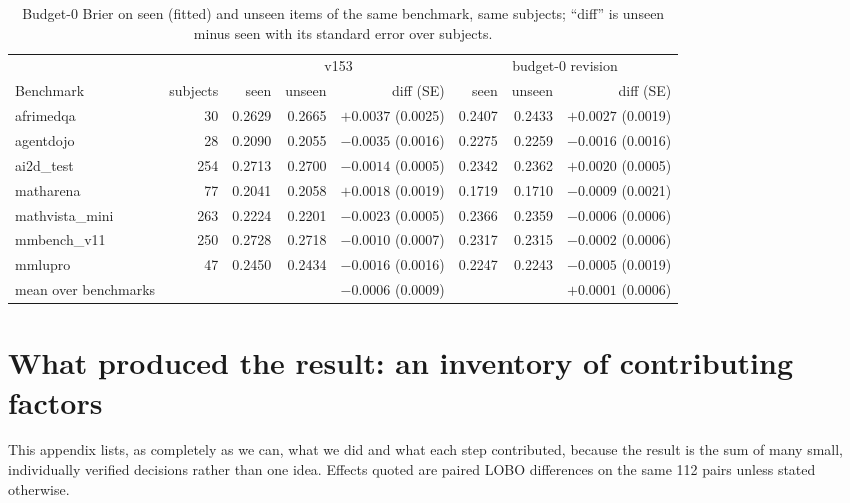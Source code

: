 \documentclass{article}
\begin{document}
\begin{table}[h]
\caption{Budget-0 Brier on seen (fitted) and unseen items of the same benchmark, same subjects; ``diff'' is unseen minus seen with its standard error over subjects.}
\label{tab:unseen}
\centering\footnotesize
\begin{tabular}{lrrrrrrr}
\toprule
 & & \multicolumn{3}{c}{v153} & \multicolumn{3}{c}{budget-0 revision} \\
Benchmark & subjects & seen & unseen & diff (SE) & seen & unseen & diff (SE) \\
\midrule
afrimedqa & 30 & 0.2629 & 0.2665 & $+0.0037$ (0.0025) & 0.2407 & 0.2433 & $+0.0027$ (0.0019) \\
agentdojo & 28 & 0.2090 & 0.2055 & $-0.0035$ (0.0016) & 0.2275 & 0.2259 & $-0.0016$ (0.0016) \\
ai2d\_test & 254 & 0.2713 & 0.2700 & $-0.0014$ (0.0005) & 0.2342 & 0.2362 & $+0.0020$ (0.0005) \\
matharena & 77 & 0.2041 & 0.2058 & $+0.0018$ (0.0019) & 0.1719 & 0.1710 & $-0.0009$ (0.0021) \\
mathvista\_mini & 263 & 0.2224 & 0.2201 & $-0.0023$ (0.0005) & 0.2366 & 0.2359 & $-0.0006$ (0.0006) \\
mmbench\_v11 & 250 & 0.2728 & 0.2718 & $-0.0010$ (0.0007) & 0.2317 & 0.2315 & $-0.0002$ (0.0006) \\
mmlupro & 47 & 0.2450 & 0.2434 & $-0.0016$ (0.0016) & 0.2247 & 0.2243 & $-0.0005$ (0.0019) \\
\midrule
mean over benchmarks & & & & $-0.0006$ (0.0009) & & & $+0.0001$ (0.0006) \\
\bottomrule
\end{tabular}
\end{table}

\section{What produced the result: an inventory of contributing factors}
\label{app:factors}

This appendix lists, as completely as we can, what we did and what each step contributed, because the result is the sum of many small, individually verified decisions rather than one idea. Effects quoted are paired LOBO differences on the same 112 pairs unless stated otherwise.
\end{document}
